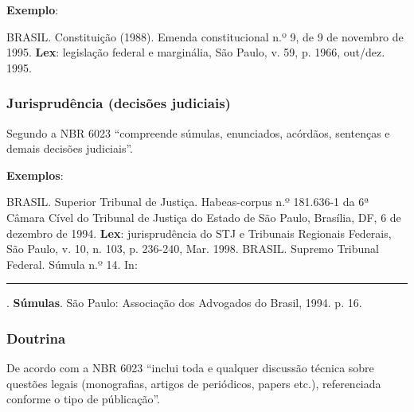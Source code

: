 \begin{exemplomanual}
\textbf{Exemplo}:\\
\begin{singlespace}
BRASIL. Constituição (1988). Emenda constitucional n.º 9, de 9 de
novembro de 1995. \textbf{Lex}: legislação federal e marginália, São Paulo, v.
59, p. 1966, out/dez. 1995.
\end{singlespace}
\end{exemplomanual}


\subsubsection{Jurisprudência (decisões judiciais)}

Segundo a NBR 6023 \cite[p.9]{NBR6023:2002} ``compreende súmulas, enunciados, acórdãos, sentenças e demais decisões judiciais''.

\begin{flushleft}
\begin{singlespace}
\end{singlespace}
\end{flushleft}

\begin{exemplomanual}
\textbf{Exemplos}:\\
\begin{singlespace}
BRASIL. Superior Tribunal de Justiça. Habeas-corpus n.º 181.636-1 da 6ª Câmara Cível do Tribunal de Justiça do Estado de São Paulo, Brasília, DF, 6 de dezembro de 1994. \textbf{Lex}: jurisprudência do STJ e Tribunais Regionais Federais, São Paulo, v. 10, n. 103, p. 236-240, Mar. 1998.
\newline
\newline
BRASIL. Supremo Tribunal Federal. Súmula n.º 14. In: \rule{1cm}{0.4pt}. \textbf{Súmulas}. São Paulo: Associação dos Advogados do Brasil, 1994. p. 16.
\end{singlespace}
\end{exemplomanual}


\subsubsection{Doutrina}

De acordo com a NBR 6023 \cite[p.10]{NBR6023:2002} ``inclui toda e qualquer discussão técnica sobre questões legais (monografias, artigos de periódicos, papers etc.), referenciada conforme o tipo de públicação''. 

